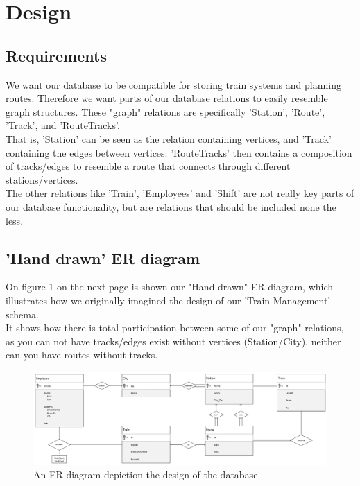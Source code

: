 \section{Design}



\subsection{Requirements} %
We want our database to be compatible for storing train systems and planning routes. Therefore we want parts of our database relations to easily resemble graph structures. These "graph" relations are specifically 'Station', 'Route', 'Track', and 'RouteTracks'.\\
That is, 'Station' can be seen as the relation containing vertices, and 'Track' containing the edges between vertices. 'RouteTracks' then contains a composition of tracks/edges to resemble a route that connects through different stations/vertices.\\[12pt]
The other relations like 'Train', 'Employees' and 'Shift' are not really key parts of our database functionality, but are relations that should be included none the less.

\subsection{'Hand drawn' ER diagram}
On figure 1 on the next page is shown our "Hand drawn" ER diagram, which 
illustrates how we originally imagined the design of our 'Train Management' 
schema.\\
It shows how there is total participation between some of our "graph" relations, as you can not have tracks/edges exist without vertices (Station/City), neither can you have routes without tracks.


\newpage
\begin{figure}[ht!]
    \centering
    \includegraphics[angle=90,origin=c,width=.4\textwidth]{img/Handwritten_ER}
    \caption{An ER diagram depiction the design of the database}
    \label{fig:ER}
\end{figure}

